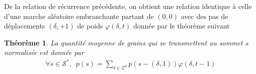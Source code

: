 \documentclass{article}
\newtheorem{theorem}{Théorème}[section]
\theoremstyle{definition}
\begin{document}
De la relation de récurrence précédente, on obtient une relation identique à celle d'une marche aléatoire embranchante partant de $(0,0)$ avec des pas de déplacements $(\delta, +1)$ de poids $\varphi(\delta, t)$ donnée par le théorème suivant
\begin{theorem}
	La quantité moyenne de grains qui se transmettent au sommet $s$ normalisée est donnée par
	\begin{align*}
	\forall s\in\mathcal{S}^*,\,\,\, p(s) = \sum_{\delta\in \mathbb{Z}^d}p(s-(\delta,1))\varphi(\delta,t-1)\end{align*} 
		


\end{theorem}
\end{document}
